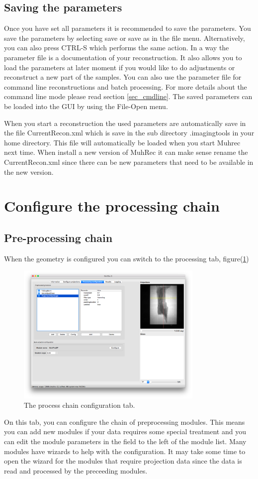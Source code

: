 \documentclass[a4paper]{scrreprt}
\begin{document}
\subsection{Saving the parameters}
Once you have set all parameters it is recommended to save the parameters. You save the parameters by selecting save or save as in the file menu. Alternatively, you can also press CTRL-S which performs the same action. In a way the parameter file is a documentation of your reconstruction. It also allows you to load the parameters at later moment if you would like to do adjustments or reconstruct a new part of the samples. You can also use the parameter file for command line reconstructions and batch processing. For more details about the command line mode please read section \ref{sec_cmdline}. The saved parameters can be loaded into the GUI by using the File-Open menu.

When you start a reconstruction the used parameters are automatically save in the file CurrentRecon.xml which is save in the sub directory .imagingtools in your home directory. This file will automatically be loaded when you start Muhrec next time. When install a new version of MuhRec it can make sense rename the CurrentRecon.xml since there can be new parameters that need to be available in the new version.

\section{Configure the processing chain}
\subsection{Pre-processing chain}
When the geometry is configured you can switch to the processing tab,
figure(\ref{fig_processtab})
\begin{figure}
 \centering
\includegraphics[width=0.8\textwidth]{figures3/Main_Modules.png}
\caption{The process chain configuration tab.}\label{fig_processtab}
\end{figure}
On this tab, you can configure the chain of preprocessing modules. This means you can add new modules if your data requires some special treatment and you can edit the module parameters in the field to the left of the module list. Many modules have wizards to help with the configuration. It may take some time to open the wizard for the modules that require projection data since the data is read and processed by the preceeding modules.
\end{document}
